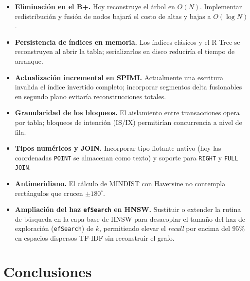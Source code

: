 \documentclass[11pt,a4paper]{article}
\begin{document}
\begin{itemize}
  \item \textbf{Eliminación en el B+.} Hoy reconstruye el árbol en $O(N)$. Implementar redistribución y fusión de nodos bajará el costo de altas y bajas a $O(\log N)$.
  \item \textbf{Persistencia de índices en memoria.} Los índices clásicos y el R-Tree se reconstruyen al abrir la tabla; serializarlos en disco reduciría el tiempo de arranque.
  \item \textbf{Actualización incremental en SPIMI.} Actualmente una escritura invalida el índice invertido completo; incorporar segmentos delta fusionables en segundo plano evitaría reconstrucciones totales.
  \item \textbf{Granularidad de los bloqueos.} El aislamiento entre transacciones opera por tabla; bloqueos de intención (IS/IX) permitirían concurrencia a nivel de fila.
  \item \textbf{Tipos numéricos y JOIN.} Incorporar tipo flotante nativo (hoy las coordenadas \texttt{POINT} se almacenan como texto) y soporte para \texttt{RIGHT} y \texttt{FULL JOIN}.
  \item \textbf{Antimeridiano.} El cálculo de MINDIST con Haversine no contempla rectángulos que crucen $\pm180^\circ$.
  \item \textbf{Ampliación del haz \texttt{efSearch} en HNSW.} Sustituir o extender la rutina de búsqueda en la capa base de HNSW para desacoplar el tamaño del haz de exploración (\texttt{efSearch}) de $k$, permitiendo elevar el \emph{recall} por encima del $95\%$ en espacios dispersos TF-IDF sin reconstruir el grafo.
\end{itemize}

\section{Conclusiones}
\end{document}

